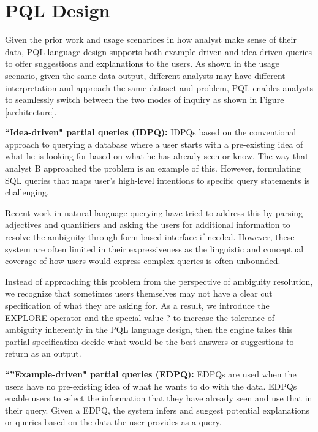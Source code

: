 \documentclass{sig-alternate-05-2015}
\begin{document}
\section{PQL Design}
Given the prior work and usage scenarioes in how analyst make sense of their data, PQL language design supports both example-driven and idea-driven queries to offer suggestions and explanations to the users. As shown in the usage scenario, given the same data output, different analysts may have different interpretation and approach the same dataset and problem, PQL enables analysts to seamlessly switch between the two modes of inquiry as shown in Figure \ref{architecture}. %
\par \textbf{``Idea-driven" partial queries (IDPQ):} IDPQs based on the conventional approach to querying a database where a user starts with a pre-existing idea of what he is looking for based on what he has already seen or know. The way that analyst B approached the problem is an example of this. %
However, formulating SQL queries that maps user's high-level intentions to specific query statements is challenging. 
\par Recent work in natural language querying have tried to address this by parsing adjectives and quantifiers and asking the users for additional information to resolve the ambiguity through form-based interface if needed. However, these system are often limited in their expressiveness as the linguistic and conceptual coverage of how users would express complex queries is often unbounded. 
\par Instead of approaching this problem from the perspective of ambiguity resolution, we recognize that sometimes users themselves may not have a clear cut specification of what they are asking for. As a result, we introduce the EXPLORE operator and the special value ? to increase the tolerance of ambiguity inherently in the PQL language design, then the engine takes this partial specification decide what would be the best answers or suggestions to return as an output.
\par \textbf{``''Example-driven" partial queries (EDPQ):} EDPQs are used when the users have no pre-existing idea of what he wants to do with the data. EDPQs enable users to select the information that they have already seen and use that in their query. Given a EDPQ, the system infers and suggest potential explanations or queries based on the data the user provides as a query.
\end{document}
